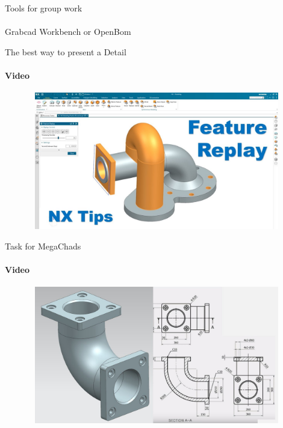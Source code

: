 \documentclass[aspectratio=169]{beamer}
\begin{document}
\begin{frame}[c]{Tools for group work}
\framesubtitle{}
\LARGE
\centering Grabcad Workbench or OpenBom
\end{frame}

\begin{frame}[t]{The best way to present a Detail}
    \framesubtitle{Video}
    \vspace{-0.6cm}
    \begin{figure}[H]
        \href{https://youtu.be/DKW2Kok3umk}{
            \centering\includegraphics[height=6cm,width=1\textwidth,keepaspectratio]{replay_preview.jpg}}
        \label{fig:replay_preview.jpg}
    \end{figure}
\end{frame}

\begin{frame}[t]{Task for MegaChads}
    \framesubtitle{Video}
    \vspace{-0.6cm}
    \begin{figure}[H]
        \href{https://youtu.be/LirvZRS8lRQ}{
            \centering\includegraphics[height=6cm,width=1\textwidth,keepaspectratio]{megachad.jpg}}
        \label{fig:megachad.jpg}
    \end{figure}
\end{frame}
\end{document}
